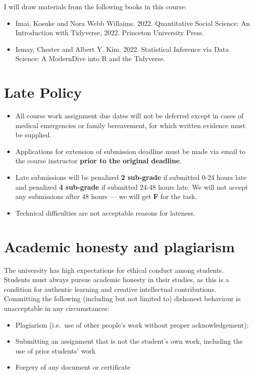 \documentclass[
  letterpaper,
  DIV=11,
  numbers=noendperiod]{scrartcl}
\begin{document}
I will draw materials from the following books in this course:

\begin{itemize}
\item
  Imai, Kosuke and Nora Webb Willaims. 2022. Quantitative Social
  Science: An Introduction with Tidyverse, 2022. Princeton University
  Press.
\item
  Ismay, Chester and Albert Y. Kim. 2022. Statistical Inference via Data
  Science: A ModernDive into R and the Tidyverse.
\end{itemize}

\section{Late Policy}\label{late-policy}

\begin{itemize}
\item
  All course work assignment due dates will not be deferred except in
  cases of medical emergencies or family bereavement, for which written
  evidence must be supplied.
\item
  Applications for extension of submission deadline must be made via
  email to the course instructor \textbf{prior to the original
  deadline}.
\item
  Late submissions will be penalized \textbf{2 sub-grade} if submitted
  0-24 hours late and penalized \textbf{4 sub-grade} if submitted 24-48
  hours late. We will not accept any submissions after 48 hours --- we
  will get \textbf{F} for the task.
\item
  Technical difficulties are not acceptable reasons for lateness.
\end{itemize}

\section{Academic honesty and
plagiarism}\label{academic-honesty-and-plagiarism}

The university has high expectations for ethical conduct among students.
Students must always pursue academic honesty in their studies, as this
is a condition for authentic learning and creative intellectual
contributions. Committing the following (including but not limited to)
dishonest behaviour is unacceptable in any circumstances:

\begin{itemize}
\item
  Plagiarism (i.e.~use of other people's work without proper
  acknowledgement);
\item
  Submitting an assignment that is not the student's own work, including
  the use of prior students' work
\item
  Forgery of any document or certificate
\end{itemize}
\end{document}
